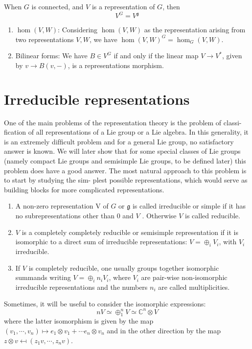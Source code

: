 \documentclass{report}
\begin{document}
\begin{remark}
    When $G$ is connected, and $V$ is a representation of $G$, then
    \[
    V^G = V^{\mathfrak g}
    \]
\end{remark}

\begin{example}
    \begin{enumerate}[label = (\roman*)]
        \item $\hom(V, W)$: Considering $\hom(V,W)$ as the representation arising from two representations $V, W$, we have $\hom(V, W)^G = \hom_G(V, W)$.
        \item Bilinear forms: We have $B \in V^G$ if and only if the linear map $V \to V^*$, given by $v \to B(v, -)$, is a representations morphism.
    \end{enumerate}
\end{example}

\section{Irreducible representations}
One of the main problems of the representation theory is the problem of classi-
ﬁcation of all representations of a Lie group or a Lie algebra. In this generality,
it is an extremely difﬁcult problem and for a general Lie group, no satisfactory
answer is known. We will later show that for some special classes of Lie groups
(namely compact Lie groups and semisimple Lie groups, to be deﬁned later)
this problem does have a good answer.
The most natural approach to this problem is to start by studying the sim-
plest possible representations, which would serve as building blocks for more
complicated representations.

\begin{definition}
    \begin{enumerate}[label = (\roman*)]
        \item A non-zero representation V of $G$ or $\mathfrak g$ is called irreducible
        or simple if it has no subrepresentations other than $0$ and $V$ . 
        Otherwise $V$ is called reducible.
        \item $V$ is a completely completely reducible or semisimple representation if it is isomorphic to a direct sum of irreducible representations:
        $V = \oplus_i V_i$, with $V_i$ irreducible.
        \item If $V$ is completely reducible, one usually groups together isomorphic summands writing $V = \oplus_i n_i V_i$, where $V_i$ are pair-wise non-isomorphic irreducible
        representations and the numbers $n_i$ are called multiplicities.
    \end{enumerate}
\end{definition}
\begin{remark}
    Sometimes, it will be useful to consider the isomorphic expressions:
    \[
    n V \simeq \oplus_1^n V \simeq \mathbb C^n \otimes V
    \]
    where the latter isomorphism is given by the map $(v_1, \cdots, v_n) \mapsto e_1 \otimes v_1 + \cdots  e_n \otimes v_n $ and in the other direction by the map $z \otimes v \mapsfrom (z_1v, \cdots, z_n v)$.
\end{remark}
\end{document}
